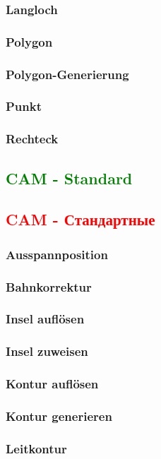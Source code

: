 \documentclass[14pt,a4paper]{book}
\newcommand{\DE}[1]{\textcolor{green}{#1}}
\newcommand{\RU}[1]{\textcolor{red}{#1}}
\begin{document}
			\subsubsection{Langloch} 
			\subsubsection{Polygon} 
			\subsubsection{Polygon-Generierung} 
			\subsubsection{Punkt} 
			\subsubsection{Rechteck} 
		\DE{\subsection{CAM - Standard}}
		\RU{\subsection{CAM - Стандартные}}
			\subsubsection{Ausspannposition} 
			\subsubsection{Bahnkorrektur} 
			\subsubsection{Insel auflösen}
			\subsubsection{Insel zuweisen} 
			\subsubsection{Kontur auflösen}
			\subsubsection{Kontur generieren}
			\subsubsection{Leitkontur} 
\end{document}

